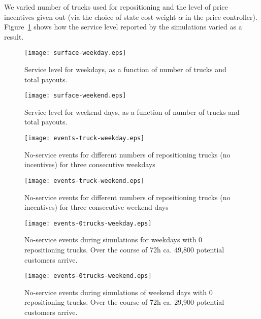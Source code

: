 \documentclass{article}
\begin{document}
We varied number of trucks used for repositioning and the level of price
incentives given out (via the choice of state cost weight $\alpha$ in the price
controller). Figure~\ref{fig:servicelevel} shows how the service level reported
by the simulations varied as a result.

\begin{subfigures}
  \begin{figure}
    \begin{minipage}[h]{.475\linewidth}
    \centering
    \texttt{[image: surface-weekday.eps]}
    \caption{Service level for weekdays, as a function of number of trucks and
      total payouts.}
    \end{minipage}
    \hfill
    \begin{minipage}[h]{.475\linewidth}
    \centering
    \texttt{[image: surface-weekend.eps]}
    \caption{Service level for weekend days, as a function of number of trucks and
      total payouts.}
    \end{minipage}
  \label{fig:servicelevel}
  \end{figure}
\end{subfigures}

\begin{subfigures}
  \begin{figure}
    \begin{minipage}[h]{.475\linewidth}
    \centering
    \texttt{[image: events-truck-weekday.eps]}
    \caption{No-service events for different numbers of repositioning trucks (no
      incentives) for three consecutive weekdays}
    \end{minipage}
    \hfill
    \begin{minipage}[h]{.475\linewidth}
    \centering
    \texttt{[image: events-truck-weekend.eps]}
    \caption{No-service events for different numbers of repositioning trucks (no
      incentives) for three consecutive weekend days}
    \end{minipage}
  \label{fig:trucks}
  \end{figure}
\end{subfigures}

\begin{subfigures}
  \begin{figure}
    \begin{minipage}[h]{.475\linewidth}
      \centering
      \texttt{[image: events-0trucks-weekday.eps]}
      \caption{No-service events during simulations for weekdays with 0
        repositioning trucks. Over the course of 72h ca. 49,800 potential
        customers arrive.}
    \end{minipage}
    \hfill
    \begin{minipage}[h]{.475\linewidth}
      \centering
      \texttt{[image: events-0trucks-weekend.eps]}
      \caption{No-service events during simulations of weekend days with 0
        repositioning trucks. Over the course of 72h ca. 29,900 potential
        customers arrive.}
    \end{minipage}
    \label{fig:incentives}
  \end{figure}
\end{subfigures}
\end{document}
